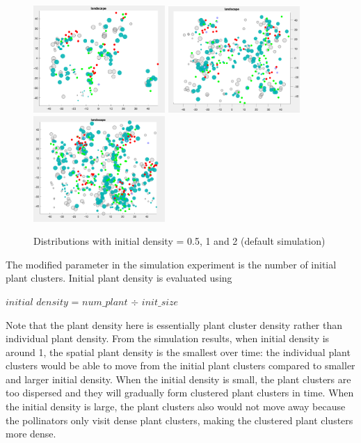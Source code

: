 \documentclass[3p,,preprint,12pt]{elsarticle}
\begin{document}
    \begin{figure}[!htb]
    \begin{center}
    \includegraphics[width=50mm]{figures/s1_1.png} 
    \includegraphics[width=50mm]{figures/s1_2.png} 
    \includegraphics[width=50mm]{figures/s1_3.png} 
    \caption{Distributions with initial density = 0.5, 1 and 2 (default simulation)}
    \end{center}
    \end{figure}
    
The modified parameter in the simulation experiment is the number of initial plant clusters. Initial plant density is evaluated using 
        \begin{center}
        $initial$ $density$ = $num\_plant$ $\div$ $init\_size$
        \end{center}
Note that the plant density here is essentially plant cluster density rather than individual plant density. From the simulation results, when initial density is around 1, the spatial plant density is the smallest over time: the individual plant clusters would be able to move from the initial plant clusters compared to smaller and larger initial density. When the initial density is small, the plant clusters are too dispersed and they will gradually form clustered plant clusters in time. When the initial density is large, the plant clusters also would not move away because the pollinators only visit dense plant clusters, making the clustered plant clusters more dense. 
\end{document}
